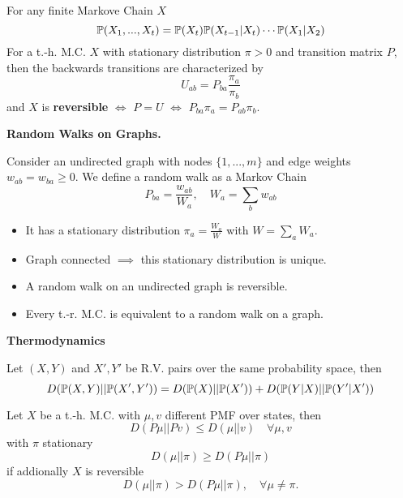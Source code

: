For any finite Markove Chain \(X\)
\[\P(X_1, ...,X_t) = \P(X_t)\P(X_{t-1}|X_t)\cdots \P(X_1|X_2)\]
For a t.-h. M.C. \(X\) with stationary distribution \(\pi > 0\) and transition matrix \(P\), 
then the backwards transitions are characterized by
\[U_{ab} = P_{ba}\frac{\pi_a}{\pi_b}\]
and \(X\) is \textbf{reversible} \(\iff\) \(P = U\) \(\iff\) \(P_{ba}\pi_a = P_{ab}\pi_b\).

\textbf{Random Walks on Graphs.}

Consider an undirected graph with nodes \(\{1, ..., m\}\) and edge weights \(w_{ab} = w_{ba} \geq 0\). 
We define a random walk as a Markov Chain
\[P_{ba} = \frac{w_{ab}}{W_a}, \quad W_a = \sum_{b}w_{ab}\]
\begin{itemize}[label=-]
    \item It has a stationary distribution \(\pi_a = \frac{W_a}{W}\) with \(W = \sum_a W_a\).
    \item Graph connected \(\implies\) this stationary distribution is unique.
    \item A random walk on an undirected graph is reversible.
    \item Every t.-r. M.C. is equivalent to a random walk on a graph.
\end{itemize}
\textbf{Thermodynamics}

Let \((X, Y)\) and \(X', Y'\) be R.V. pairs over the same probability space, then
\[D(\P(X, Y) || \P(X', Y')) = D(\P(X) || \P(X')) + D(\P(Y|X) || \P(Y'|X'))\]

Let \(X\) be a t.-h. M.C. with \(\mu, v\) different PMF over states, then
\[D(P\mu || Pv) \leq D(\mu || v) \quad \forall \mu, v\]
with \(\pi\) stationary
\[D(\mu || \pi) \geq D(P \mu || \pi)\]
if addionally \(X\) is reversible
\[D(\mu || \pi) > D(P\mu || \pi), \quad \forall \mu \neq \pi.\]



